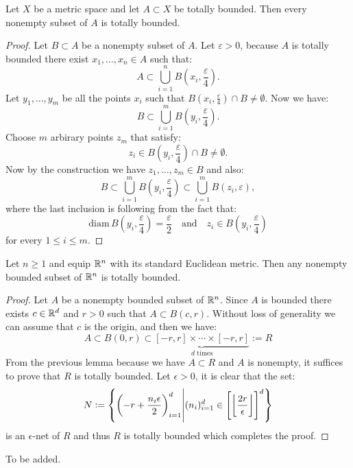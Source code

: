 \documentclass[11pt,a4paper]{article}
\begin{document}
\begin{lemma}
  Let $X$ be a metric space and let $A \subset X$ be totally bounded.
  Then every nonempty subset of $A$ is totally bounded.
\end{lemma}
\begin{proof}
  Let $B \subset A$ be a nonempty subset of $A$. Let $\varepsilon > 0$, 
  because $A$ is totally bounded there exist $x_1,\dots,x_n \in A$ such that:
  \[
    A \subset \bigcup_{i=1}^{n}{B\left(x_i,\frac{\varepsilon}{4}\right)}.
  \]
  Let $y_1,\dots,y_m$ be all the points $x_i$ such that 
  $B(x_i,\frac{\varepsilon}{4}) \cap B \neq \emptyset$. Now we have:
  \[
    B \subset \bigcup_{i=1}^{m}B\left(y_i,\frac{\varepsilon}{4}\right).
  \]
  Choose $m$ arbirary points $z_m$ that satisfy:
  \[
    z_i \in B\left(y_i,\frac{\varepsilon}{4}\right) \cap B \neq \emptyset.
  \]
  Now by the construction we have $z_1,\dots,z_m \in B$ and also:
  \[
    B \subset \bigcup_{i=1}^{m}B\left(y_i,\frac{\varepsilon}{4}\right) 
    \subset \bigcup_{i=1}^{m}B\left(z_i,\varepsilon\right),
  \]
  where the last inclusion is following from the fact that:
  \[
    \mathrm{diam}\, B\left(y_i,\frac{\varepsilon}{4}\right) = 
    \frac{\varepsilon}{2} \quad \text{and} \quad 
    z_i \in B\left(y_i,\frac{\varepsilon}{4}\right)
  \]
  for every $1 \le i \le m$.
\end{proof}

\begin{lemma}
  Let $n \geq 1$ and equip $\mathbb{R}^n$ with its standard Euclidean metric.
  Then any nonempty bounded subset of $\mathbb{R}^n$ is totally bounded.
\end{lemma}
\begin{proof}
  Let $A$ be a nonempty bounded subset of $\mathbb{R}^n$. Since $A$ is bounded
  there exists $c \in \mathbb{R}^d$ and $r > 0$ such that $A \subset B(c,r)$. 
  Without loss of generality we can assume that $c$ is the origin,
  and then we have:
  \[
    A \subset B(0,r) \subset 
    \underbrace{[-r,r] \times \cdots \times [-r,r]}_{d \text{ times}} :=
    R
  \]
  From the previous lemma because we have $A \subset R$ and $A$ is
  nonempty, it suffices to prove that $R$ is totally bounded. Let 
  $\epsilon > 0$, it is clear that the set:
  \[
    N := \left\{\left(-r + \frac{n_i\epsilon}{2}\right)_{i=1}^{d} 
    \middle\vert (n_i)_{i=1}^{d} \in 
    {\left[\left\lfloor \frac{2r}{\epsilon} \right\rfloor\right]}^{d}\right\}
  \]
  is an $\epsilon$-net of $R$ and thus $R$ is totally bounded which
  completes the proof.
\end{proof}

\begin{proofof}{}
  To be added.
\end{proofof}
\end{document}
